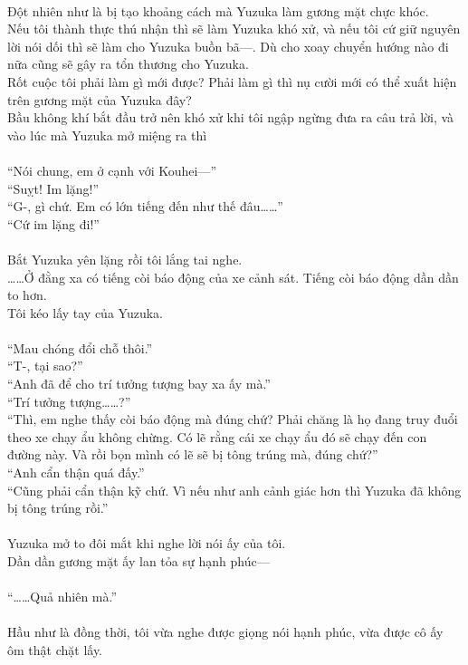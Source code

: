 \documentclass[12pt,a4paper, twosides]{book}
\begin{document}
\\
Đột nhiên như là bị tạo khoảng cách mà Yuzuka làm gương mặt chực khóc.\\
Nếu tôi thành thực thú nhận thì sẽ làm Yuzuka khó xử, và nếu tôi cứ giữ nguyên lời nói dối thì sẽ làm cho Yuzuka buồn bã—. Dù cho xoay chuyển hướng nào đi nữa cũng sẽ gây ra tổn thương cho Yuzuka.\\
Rốt cuộc tôi phải làm gì mới được? Phải làm gì thì nụ cười mới có thể xuất hiện trên gương mặt của Yuzuka đây?\\
Bầu không khí bắt đầu trở nên khó xử khi tôi ngập ngừng đưa ra câu trả lời, và vào lúc mà Yuzuka mở miệng ra thì\\
\\
“Nói chung, em ở cạnh với Kouhei—”\\
“Suỵt! Im lặng!”\\
“G-, gì chứ. Em có lớn tiếng đến như thế đâu……”\\
“Cứ im lặng đi!”\\
\\
Bắt Yuzuka yên lặng rồi tôi lắng tai nghe.\\
……Ở đằng xa có tiếng còi báo động của xe cảnh sát. Tiếng còi báo động dần dần to hơn.\\
Tôi kéo lấy tay của Yuzuka.\\
\\
“Mau chóng đổi chỗ thôi.”\\
“T-, tại sao?”\\
“Anh đã để cho trí tưởng tượng bay xa ấy mà.”\\
“Trí tưởng tượng……?”\\
“Thì, em nghe thấy còi báo động mà đúng chứ? Phải chăng là họ đang truy đuổi theo xe chạy ẩu không chừng. Có lẽ rằng cái xe chạy ẩu đó sẽ chạy đến con đường này. Và rồi bọn mình có lẽ sẽ bị tông trúng mà, đúng chứ?”\\
“Anh cẩn thận quá đấy.”\\
“Cũng phải cẩn thận kỹ chứ. Vì nếu như anh cảnh giác hơn thì Yuzuka đã không bị tông trúng rồi.”\\
\\
Yuzuka mở to đôi mắt khi nghe lời nói ấy của tôi.\\
Dần dần gương mặt ấy lan tỏa sự hạnh phúc—\\
\\
“……Quả nhiên mà.”\\
\\
Hầu như là đồng thời, tôi vừa nghe được giọng nói hạnh phúc, vừa được cô ấy ôm thật chặt lấy.\\
\end{document}

